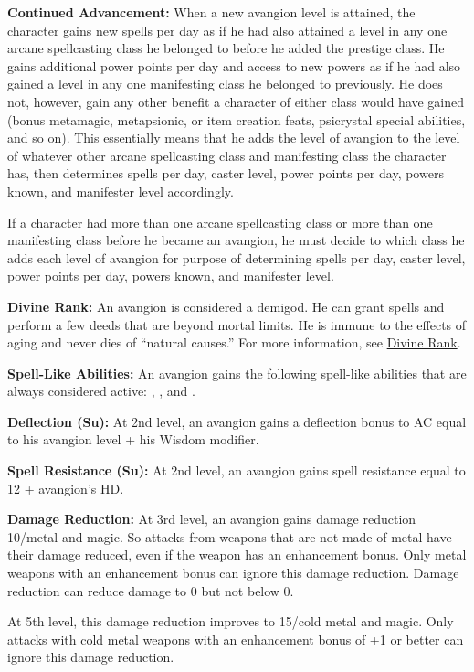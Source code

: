 {
\textbf{Continued Advancement:} When a new avangion level is attained, the character gains new spells per day as if he had also attained a level in any one arcane spellcasting class he belonged to before he added the prestige class. He gains additional power points per day and access to new powers as if he had also gained a level in any one manifesting class he belonged to previously. He does not, however, gain any other benefit a character of either class would have gained (bonus metamagic, metapsionic, or item creation feats, psicrystal special abilities, and so on). This essentially means that he adds the level of avangion to the level of whatever other arcane spellcasting class and manifesting class the character has, then determines spells per day, caster level, power points per day, powers known, and manifester level accordingly.

If a character had more than one arcane spellcasting class or more than one manifesting class before he became an avangion, he must decide to which class he adds each level of avangion for purpose of determining spells per day, caster level, power points per day, powers known, and manifester level.

\textbf{Divine Rank:} An avangion is considered a demigod. He can grant spells and perform a few deeds that are beyond mortal limits. He is immune to the effects of aging and never dies of ``natural causes.'' For more information, see \hyperref[Divine Rank]{Divine Rank}.

\textbf{Spell-Like Abilities:} An avangion gains the following spell-like abilities that are always considered active: , , and .


\textbf{Deflection (Su):} At 2nd level, an avangion gains a deflection bonus to AC equal to his avangion level + his Wisdom modifier.

\textbf{Spell Resistance (Su):} At 2nd level, an avangion gains spell resistance equal to 12 + avangion's HD.

\textbf{Damage Reduction:} At 3rd level, an avangion gains damage reduction 10/metal and magic. So attacks from weapons that are not made of metal have their damage reduced, even if the weapon has an enhancement bonus. Only metal weapons with an enhancement bonus can ignore this damage reduction. Damage reduction can reduce damage to 0 but not below 0.

At 5th level, this damage reduction improves to 15/cold metal and magic. Only attacks with cold metal weapons with an enhancement bonus of +1 or better can ignore this damage reduction.

}
